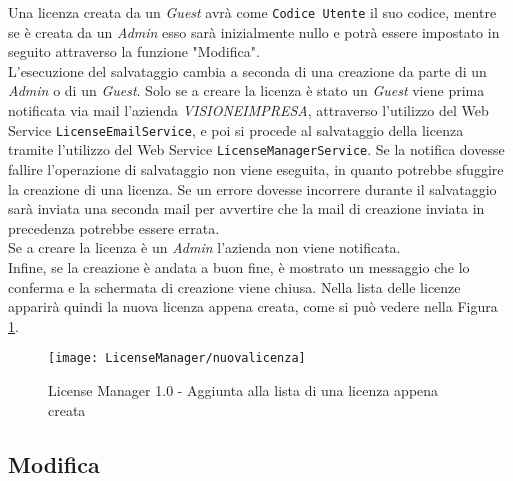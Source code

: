 Una licenza creata da un \textit{Guest} avrà come \texttt{Codice Utente} il suo codice, mentre se è creata da un \textit{Admin} esso sarà inizialmente nullo e potrà essere impostato in seguito attraverso la funzione "Modifica".
\\
L’esecuzione del salvataggio cambia a seconda di una creazione da parte di un \textit{Admin} o di un \textit{Guest}.
Solo se a creare la licenza è stato un \textit{Guest} viene prima notificata via mail l'azienda \textit{VISIONEIMPRESA}, attraverso l'utilizzo del Web Service \texttt{LicenseEmailService}, e poi si procede al salvataggio della licenza tramite l'utilizzo del Web Service \texttt{LicenseManagerService}. Se la notifica dovesse fallire l’operazione di salvataggio non viene eseguita, in quanto potrebbe sfuggire la creazione di una licenza. Se un errore dovesse incorrere durante il salvataggio sarà inviata una seconda mail per avvertire che la mail di creazione inviata in precedenza potrebbe essere errata.\\
Se a creare la licenza è un \textit{Admin} l'azienda non viene notificata.
\\
Infine, se la creazione è andata a buon fine, è mostrato un messaggio che lo conferma e la schermata di creazione viene chiusa. Nella lista delle licenze apparirà quindi la nuova licenza appena creata, come si può vedere nella Figura \ref{nuova}.

\begin{figure}[!h] 
    \centering 
    \texttt{[image: LicenseManager/nuovalicenza]} 
    \caption{License Manager 1.0 - Aggiunta alla lista di una licenza appena creata}
\label{nuova}
\end{figure}


\subsection{Modifica}

